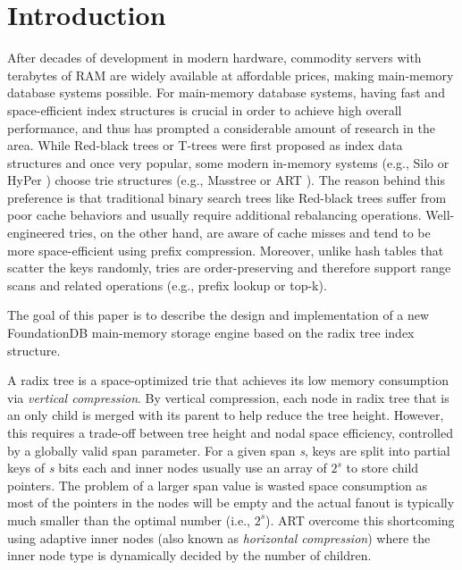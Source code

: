 \documentclass[sigplan,screen,nonacm]{acmart}
\begin{document}
\maketitle

\section{Introduction}
\label{sec:intro}
After decades of development in modern hardware, commodity servers with terabytes of RAM are widely available at affordable prices, making main-memory database systems possible. For main-memory database systems, having fast and space-efficient index structures is crucial in order to achieve high overall performance, and thus has prompted a considerable amount of research in the area. While Red-black trees \cite{bayer1972symmetric} or T-trees \cite{lehman1985study} were first proposed as index data structures and once very popular, some modern in-memory systems (e.g., Silo \cite{tu2013speedy} or HyPer \cite{kemper2011hyper}) choose trie structures (e.g., Masstree \cite{mao2012cache} or ART \cite{leis2013adaptive}). The reason behind this preference is that traditional binary search trees like Red-black trees suffer from poor cache behaviors \cite{rao1998cache} and usually require additional rebalancing operations. Well-engineered tries, on the other hand, are aware of cache misses and tend to be more space-efficient using prefix compression. Moreover, unlike hash tables that scatter the keys randomly, tries are order-preserving and therefore support range scans and related operations (e.g., prefix lookup or top-k).

The goal of this paper is to describe the design and implementation of a new FoundationDB main-memory storage engine based on the radix tree index structure. 

A radix tree \cite{addme} is a space-optimized trie that achieves its low memory consumption via {\itshape vertical compression}. By vertical compression, each node in radix tree that is an only child is merged with its parent to help reduce the tree height. However, this requires a trade-off between tree height and nodal space efficiency, controlled by a globally valid span parameter. For a given span {\itshape s}, keys are split into partial keys of {\itshape s} bits each and inner nodes usually use an array of $2^{s}$ to store child pointers. The problem of a larger span value is wasted space consumption as most of the pointers in the nodes will be empty and the actual fanout is typically much smaller than the optimal number (i.e., $2^{s}$). ART \cite{leis2013adaptive} overcome this shortcoming using adaptive inner nodes (also known as {\itshape horizontal compression}) where the inner node type is dynamically decided by the number of children. 
\end{document}
